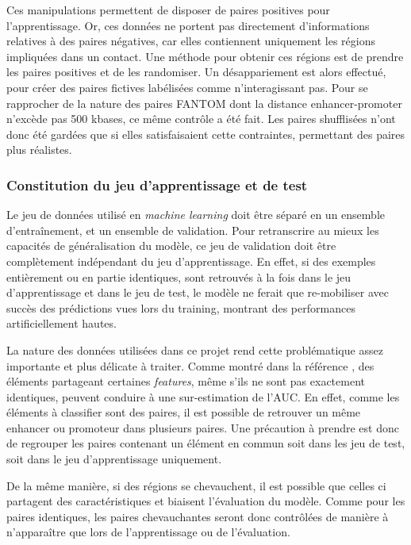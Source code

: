 \documentclass[french]{llncs}
\begin{document}
Ces manipulations permettent de disposer de paires positives pour l'apprentissage. Or, ces données ne portent pas directement d'informations relatives à des paires négatives, car elles contiennent uniquement les régions impliquées dans un contact.
Une méthode pour obtenir ces régions est de prendre les paires positives et de les randomiser. Un désappariement est alors effectué, pour créer des paires fictives labélisées comme n'interagissant pas. Pour se rapprocher de la nature des paires FANTOM dont la distance enhancer-promoter n'excède pas 500 kbases, ce même contrôle a été fait. Les paires shufflisées n'ont donc été gardées que si elles satisfaisaient cette contraintes, permettant des paires plus réalistes.

\subsubsection{Constitution du jeu d'apprentissage et de test}


Le jeu de données utilisé en \textit{machine learning} doit être séparé en un ensemble d'entraînement, et un ensemble de validation. Pour retranscrire au mieux les capacités de généralisation du modèle, ce jeu de validation doit être complètement indépendant du jeu d'apprentissage. En effet, si des exemples entièrement ou en partie identiques, sont retrouvés à la fois dans le jeu d'apprentissage et dans le jeu de test, le modèle ne ferait que re-mobiliser avec succès des prédictions vues lors du training, montrant des performances artificiellement hautes.

La nature des données utilisées dans ce projet rend cette problématique assez importante et plus délicate à traiter. Comme montré dans la référence \cite{xi_local_2018}, des éléments partageant certaines \textit{features}, même s'ils ne sont pas exactement identiques, peuvent conduire à une sur-estimation de l'AUC. En effet, comme les éléments à classifier sont des paires, il est possible de retrouver un même enhancer ou promoteur dans plusieurs paires. Une précaution à prendre est donc de regrouper les paires contenant un élément en commun soit dans les jeu de test, soit dans le jeu d'apprentissage uniquement. 

De la même manière, si des régions se chevauchent, il est possible que celles ci partagent des caractéristiques et biaisent l'évaluation du modèle. Comme pour les paires identiques, les paires chevauchantes seront donc contrôlées de manière à n'apparaître que lors de l'apprentissage ou de l'évaluation.
\end{document}
